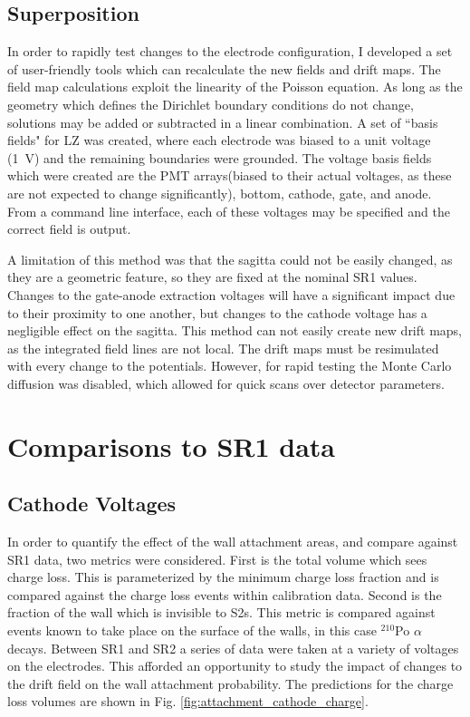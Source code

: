 \subsection{Superposition}

In order to rapidly test changes to the electrode configuration, I developed a set of user-friendly tools which can recalculate the new fields and drift maps.
The field map calculations exploit the linearity of the Poisson equation.
As long as the geometry which defines the Dirichlet boundary conditions do not change, solutions may be added or subtracted in a linear combination.
A set of ``basis fields" for LZ was created, where each electrode was biased to a unit voltage (1~V) and the remaining boundaries were grounded. 
The voltage basis fields which were created are the PMT arrays(biased to their actual voltages, as these are not expected to change significantly), bottom, cathode, gate, and anode.
From a command line interface, each of these voltages may be specified and the correct field is output.

A limitation of this method was that the sagitta could not be easily changed, as they are a geometric feature, so they are fixed at the nominal SR1 values.
Changes to the gate-anode extraction voltages will have a significant impact due to their proximity to one another, but changes to the cathode voltage has a negligible effect on the sagitta.
This method can not easily create new drift maps, as the integrated field lines are not local.
The drift maps must be resimulated with every change to the potentials.
However, for rapid testing the Monte Carlo diffusion was disabled, which allowed for quick scans over detector parameters.


\section{Comparisons to SR1 data}


\subsection{Cathode Voltages}
\label{sec:cathode_voltages}
In order to quantify the effect of the wall attachment areas, and compare against SR1 data, two metrics were considered.
First is the total volume which sees charge loss.
This is parameterized by the minimum charge loss fraction and is compared against the charge loss events within calibration data.
Second is the fraction of the wall which is invisible to S2s.
This metric is compared against events known to take place on the surface of the walls, in this case $^{210}$Po $\alpha $ decays.
Between SR1 and SR2 a series of data were taken at a variety of voltages on the electrodes. 
This afforded an opportunity to study the impact of changes to the drift field on the wall attachment probability.
The predictions for the charge loss volumes are shown in Fig. \ref{fig:attachment_cathode_charge}.

